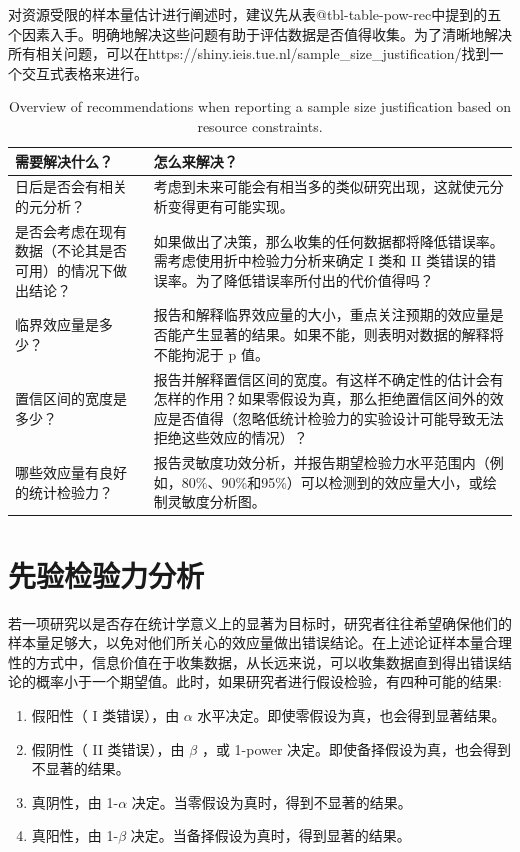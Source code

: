\documentclass[
  letterpaper,
  DIV=11,
  numbers=noendperiod]{scrreprt}
\providecommand{\tightlist}{%
  \setlength{\itemsep}{0pt}\setlength{\parskip}{0pt}}\usepackage{longtable,booktabs,array}
\begin{document}
对资源受限的样本量估计进行阐述时，建议先从表@tbl-table-pow-rec中提到的五个因素入手。明确地解决这些问题有助于评估数据是否值得收集。为了清晰地解决所有相关问题，可以在https://shiny.ieis.tue.nl/sample\_size\_justification/找到一个交互式表格来进行。

\hypertarget{tbl-table-pow-rec}{}
\begin{table}
\caption{\label{tbl-table-pow-rec}Overview of recommendations when reporting a sample size justification
based on resource constraints. }\tabularnewline

\centering
\begin{tabular}{>{\raggedright\arraybackslash}p{5cm}|>{\raggedright\arraybackslash}p{10cm}}
\hline
需要解决什么？ & 怎么来解决？\\
\hline
日后是否会有相关的元分析？ & 考虑到未来可能会有相当多的类似研究出现，这就使元分析变得更有可能实现。\\
\hline
是否会考虑在现有数据（不论其是否可用）的情况下做出结论？ & 如果做出了决策，那么收集的任何数据都将降低错误率。需考虑使用折中检验力分析来确定 I 类和 II 类错误的错误率。为了降低错误率所付出的代价值得吗？\\
\hline
临界效应量是多少？ & 报告和解释临界效应量的大小，重点关注预期的效应量是否能产生显著的结果。如果不能，则表明对数据的解释将不能拘泥于 p 值。\\
\hline
置信区间的宽度是多少？ & 报告并解释置信区间的宽度。有这样不确定性的估计会有怎样的作用？如果零假设为真，那么拒绝置信区间外的效应是否值得（忽略低统计检验力的实验设计可能导致无法拒绝这些效应的情况）？\\
\hline
哪些效应量有良好的统计检验力？ & 报告灵敏度功效分析，并报告期望检验力水平范围内（例如，80\%、90\%和95\%）可以检测到的效应量大小，或绘制灵敏度分析图。\\
\hline
\end{tabular}
\end{table}

\hypertarget{sec-aprioripower}{%
\section{先验检验力分析}\label{sec-aprioripower}}

若一项研究以是否存在统计学意义上的显著为目标时，研究者往往希望确保他们的样本量足够大，以免对他们所关心的效应量做出错误结论。在上述论证样本量合理性的方式中，信息价值在于收集数据，从长远来说，可以收集数据直到得出错误结论的概率小于一个期望值。此时，如果研究者进行假设检验，有四种可能的结果:

\begin{enumerate}
\def\labelenumi{\arabic{enumi}.}
\tightlist
\item
  假阳性（ I 类错误），由 \(\alpha\)
  水平决定。即使零假设为真，也会得到显著结果。
\item
  假阴性（ II 类错误），由 \(\beta\) ，或 1-power
  决定。即使备择假设为真，也会得到不显著的结果。
\item
  真阴性，由 1-\(\alpha\) 决定。当零假设为真时，得到不显著的结果。
\item
  真阳性，由 1-\(\beta\) 决定。当备择假设为真时，得到显著的结果。
\end{enumerate}
\end{document}
